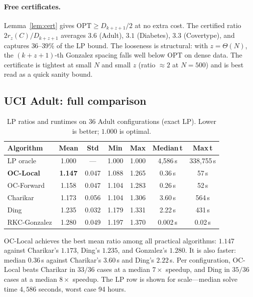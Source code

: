 \documentclass[twoside,leqno,twocolumn]{article}
\newcommand{\OPT}{\mathrm{OPT}}
\newcommand{\rz}{r_z}
\begin{document}
\paragraph{Free certificates.}
Lemma~\ref{lem:cert} gives $\OPT\ge D_{k+z+1}/2$ at no extra cost.
The certified ratio $2\rz(C)/D_{k+z+1}$ averages $3.6$ (Adult),
$3.1$ (Diabetes), $3.3$ (Covertype), and captures $36$--$39\%$ of
the LP bound. The looseness is structural: with $z=\Theta(N)$, the
$(k{+}z{+}1)$-th Gonzalez spacing falls well below $\OPT$ on dense
data. The certificate is tightest at small $N$ and small $z$ (ratio
$\approx2$ at $N=500$) and is best read as a quick sanity bound.

\subsection{UCI Adult: full comparison}

\begin{table}[t]
\caption{LP ratios and runtimes on 36 Adult configurations (exact LP).
Lower is better; $1.000$ is optimal.}
\label{tab:adult}
\centering
\begin{tabular}{lcccccc}
\toprule
Algorithm & Mean & Std & Min & Max & Median\,t & Max\,t \\
\midrule
LP oracle        & 1.000 & ---   & 1.000 & 1.000 & 4{,}586\,s & 338{,}755\,s \\
\textbf{OC-Local}& \textbf{1.147} & 0.047 & 1.088 & 1.265 & 0.36\,s & 57\,s \\
OC-Forward       & 1.158 & 0.047 & 1.104 & 1.283 & 0.26\,s & 52\,s \\
Charikar         & 1.173 & 0.056 & 1.104 & 1.306 & 3.60\,s & 564\,s \\
Ding             & 1.235 & 0.032 & 1.179 & 1.331 & 2.22\,s & 431\,s \\
RKC-Gonzalez     & 1.280 & 0.049 & 1.197 & 1.370 & 0.002\,s & 0.02\,s \\
\bottomrule
\end{tabular}
\end{table}

OC-Local achieves the best mean ratio among all practical algorithms:
$1.147$ against Charikar's $1.173$, Ding's $1.235$, and Gonzalez's
$1.280$. It is also faster: median $0.36$\,s against Charikar's
$3.60$\,s and Ding's $2.22$\,s. Per configuration, OC-Local beats
Charikar in $33/36$ cases at a median $7\times$ speedup, and Ding
in $35/36$ cases at a median $8\times$ speedup. The LP row is shown
for scale---median solve time $4{,}586$ seconds, worst case 94 hours.
\end{document}
